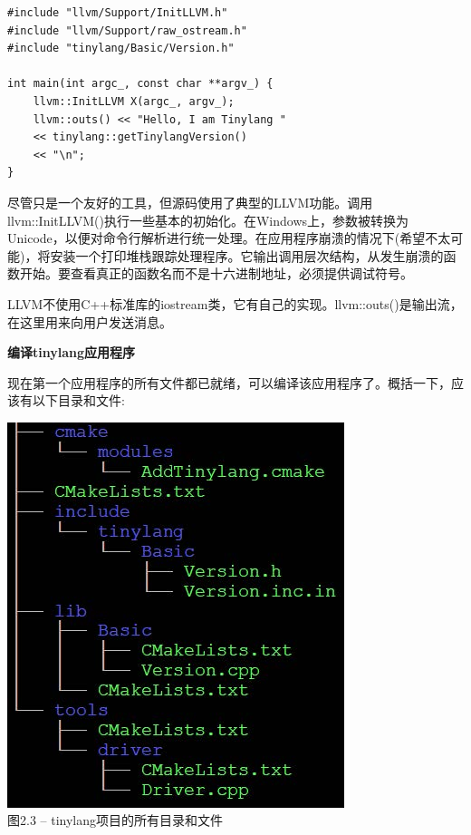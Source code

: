\begin{lstlisting}[caption={}]
#include "llvm/Support/InitLLVM.h"
#include "llvm/Support/raw_ostream.h"
#include "tinylang/Basic/Version.h"

int main(int argc_, const char **argv_) {
	llvm::InitLLVM X(argc_, argv_);
	llvm::outs() << "Hello, I am Tinylang "
	<< tinylang::getTinylangVersion()
	<< "\n";
}
\end{lstlisting}

尽管只是一个友好的工具，但源码使用了典型的LLVM功能。调用llvm::InitLLVM()执行一些基本的初始化。在Windows上，参数被转换为Unicode，以便对命令行解析进行统一处理。在应用程序崩溃的情况下(希望不太可能)，将安装一个打印堆栈跟踪处理程序。它输出调用层次结构，从发生崩溃的函数开始。要查看真正的函数名而不是十六进制地址，必须提供调试符号。\par

LLVM不使用C++标准库的iostream类，它有自己的实现。llvm::outs()是输出流，在这里用来向用户发送消息。\par

\hspace*{\fill} \par %
\textbf{编译tinylang应用程序}

现在第一个应用程序的所有文件都已就绪，可以编译该应用程序了。概括一下，应该有以下目录和文件:\par

\hspace*{\fill} \par %
\begin{center}
	\includegraphics{content/1/chapter2/images/3.jpg}\\
	图2.3 – tinylang项目的所有目录和文件
\end{center}

